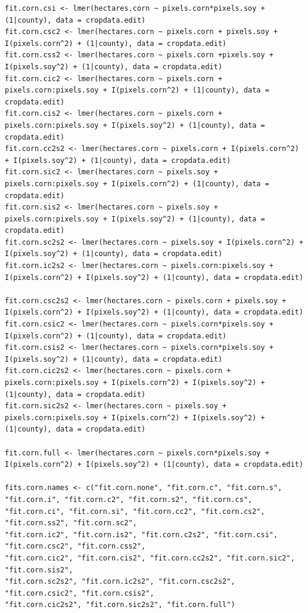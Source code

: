 \documentclass{article}
\begin{document}
\begin{Verbatim}[fontsize=\tiny]
fit.corn.csi <- lmer(hectares.corn ~ pixels.corn*pixels.soy + (1|county), data = cropdata.edit)
fit.corn.csc2 <- lmer(hectares.corn ~ pixels.corn + pixels.soy + I(pixels.corn^2) + (1|county), data = cropdata.edit)
fit.corn.css2 <- lmer(hectares.corn ~ pixels.corn +pixels.soy + I(pixels.soy^2) + (1|county), data = cropdata.edit)
fit.corn.cic2 <- lmer(hectares.corn ~ pixels.corn + pixels.corn:pixels.soy + I(pixels.corn^2) + (1|county), data = cropdata.edit)
fit.corn.cis2 <- lmer(hectares.corn ~ pixels.corn + pixels.corn:pixels.soy + I(pixels.soy^2) + (1|county), data = cropdata.edit)
fit.corn.cc2s2 <- lmer(hectares.corn ~ pixels.corn + I(pixels.corn^2) + I(pixels.soy^2) + (1|county), data = cropdata.edit)
fit.corn.sic2 <- lmer(hectares.corn ~ pixels.soy + pixels.corn:pixels.soy + I(pixels.corn^2) + (1|county), data = cropdata.edit)
fit.corn.sis2 <- lmer(hectares.corn ~ pixels.soy + pixels.corn:pixels.soy + I(pixels.soy^2) + (1|county), data = cropdata.edit)
fit.corn.sc2s2 <- lmer(hectares.corn ~ pixels.soy + I(pixels.corn^2) + I(pixels.soy^2) + (1|county), data = cropdata.edit)
fit.corn.ic2s2 <- lmer(hectares.corn ~ pixels.corn:pixels.soy + I(pixels.corn^2) + I(pixels.soy^2) + (1|county), data = cropdata.edit)

fit.corn.csc2s2 <- lmer(hectares.corn ~ pixels.corn + pixels.soy + I(pixels.corn^2) + I(pixels.soy^2) + (1|county), data = cropdata.edit)
fit.corn.csic2 <- lmer(hectares.corn ~ pixels.corn*pixels.soy + I(pixels.corn^2) + (1|county), data = cropdata.edit)
fit.corn.csis2 <- lmer(hectares.corn ~ pixels.corn*pixels.soy + I(pixels.soy^2) + (1|county), data = cropdata.edit)
fit.corn.cic2s2 <- lmer(hectares.corn ~ pixels.corn + pixels.corn:pixels.soy + I(pixels.corn^2) + I(pixels.soy^2) + (1|county), data = cropdata.edit)
fit.corn.sic2s2 <- lmer(hectares.corn ~ pixels.soy + pixels.corn:pixels.soy + I(pixels.corn^2) + I(pixels.soy^2) + (1|county), data = cropdata.edit)

fit.corn.full <- lmer(hectares.corn ~ pixels.corn*pixels.soy + I(pixels.corn^2) + I(pixels.soy^2) + (1|county), data = cropdata.edit)

fits.corn.names <- c("fit.corn.none", "fit.corn.c", "fit.corn.s", "fit.corn.i", "fit.corn.c2", "fit.corn.s2", "fit.corn.cs",
"fit.corn.ci", "fit.corn.si", "fit.corn.cc2", "fit.corn.cs2", "fit.corn.ss2", "fit.corn.sc2",
"fit.corn.ic2", "fit.corn.is2", "fit.corn.c2s2", "fit.corn.csi", "fit.corn.csc2", "fit.corn.css2",
"fit.corn.cic2", "fit.corn.cis2", "fit.corn.cc2s2", "fit.corn.sic2", "fit.corn.sis2",
"fit.corn.sc2s2", "fit.corn.ic2s2", "fit.corn.csc2s2", "fit.corn.csic2", "fit.corn.csis2",
"fit.corn.cic2s2", "fit.corn.sic2s2", "fit.corn.full")


\end{Verbatim}
\end{document}
